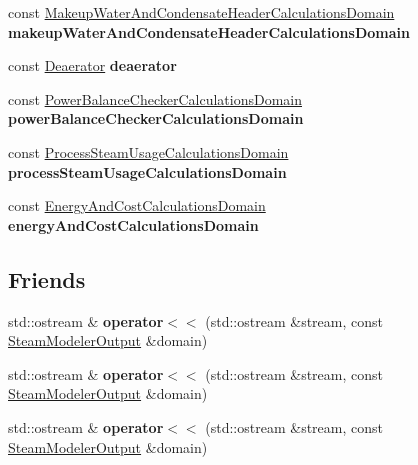 \begin{DoxyCompactItemize}
const \hyperlink{class_makeup_water_and_condensate_header_calculations_domain}{Makeup\+Water\+And\+Condensate\+Header\+Calculations\+Domain} {\bfseries makeup\+Water\+And\+Condensate\+Header\+Calculations\+Domain}
\item 
\mbox{\label{class_steam_modeler_output_a84c7bf7d292fb1c212fd0cdf3465f7b3}} 
const \hyperlink{class_deaerator}{Deaerator} {\bfseries deaerator}
\item 
\mbox{\label{class_steam_modeler_output_aafb59ca30f98cd21aee7e6ef032bfa04}} 
const \hyperlink{class_power_balance_checker_calculations_domain}{Power\+Balance\+Checker\+Calculations\+Domain} {\bfseries power\+Balance\+Checker\+Calculations\+Domain}
\item 
\mbox{\label{class_steam_modeler_output_ab1861b1a72456eaafc5dd58cd1a9b3cd}} 
const \hyperlink{class_process_steam_usage_calculations_domain}{Process\+Steam\+Usage\+Calculations\+Domain} {\bfseries process\+Steam\+Usage\+Calculations\+Domain}
\item 
\mbox{\label{class_steam_modeler_output_a1dcd4e78b20533b4da789ada5ccaaaff}} 
const \hyperlink{class_energy_and_cost_calculations_domain}{Energy\+And\+Cost\+Calculations\+Domain} {\bfseries energy\+And\+Cost\+Calculations\+Domain}
\end{DoxyCompactItemize}
\subsection*{Friends}
\begin{DoxyCompactItemize}
\item 
\mbox{\label{class_steam_modeler_output_a688b241fe74bbcd2c8db7053d8f911e4}} 
std\+::ostream \& {\bfseries operator$<$$<$} (std\+::ostream \&stream, const \hyperlink{class_steam_modeler_output}{Steam\+Modeler\+Output} \&domain)
\item 
\mbox{\label{class_steam_modeler_output_a688b241fe74bbcd2c8db7053d8f911e4}} 
std\+::ostream \& {\bfseries operator$<$$<$} (std\+::ostream \&stream, const \hyperlink{class_steam_modeler_output}{Steam\+Modeler\+Output} \&domain)
\item 
\mbox{\label{class_steam_modeler_output_a688b241fe74bbcd2c8db7053d8f911e4}} 
std\+::ostream \& {\bfseries operator$<$$<$} (std\+::ostream \&stream, const \hyperlink{class_steam_modeler_output}{Steam\+Modeler\+Output} \&domain)
\end{DoxyCompactItemize}


